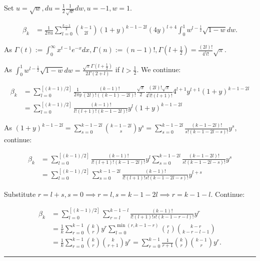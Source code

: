 \documentclass[twoside]{article}
\newenvironment{proof}{{\bf Proof:}}{\hfill\rule{2mm}{2mm}}
\begin{document}
\begin{proof}
	Set $u=\sqrt{w}, du=\frac{1}{2}\frac{1}{\sqrt{w}}dw, u=-1, w=1.$
	
	\begin{equation}
		\begin{split}
			\beta_k&=\frac{1}{2\pi u}\sum^{\frac{k-1}{2}}_{l=0}{k-1\choose 2l}(1+y)^{k-1-2l}(4y)^{l+4}\int^1_0w^{l-\frac{1}{2}}\sqrt{1-w}dw.
		\end{split}
	\end{equation}
	
	As $\Gamma(t):=\int^\infty_{0}x^{t-1}e^{-x}dx, \Gamma(n):=(n-1)!, \Gamma(l+\frac{1}{2})=\frac{(2l)!}{4^l l!}\sqrt{\pi}.$
	
	As $\int^1_0w^{l-\frac{1}{2}}\sqrt{1-w}dw=\frac{\sqrt{\pi}\Gamma(l+\frac12)}{2\Gamma(2+l)}$ if $l>\frac{1}{2}$. We continue:
	
	\begin{equation}
		\begin{split}
			\beta_k &=\sum^{[(k-1)/2]}_{l=0}\frac{1}{2\pi y}\frac{(k-1)!}{(2l)!((k-1)-2l)!}\frac{\sqrt{\pi}}{2}\frac{(2l)!\sqrt{\pi}}{4^l l!(l+1)!}4^{l+1}y^{l+1}(1+y)^{k-1-2l}\\
			&=\sum^{[(k-1)/2]}_{l=0}\frac{(k-1)!}{l!(l+1)!(k-1-2l)!}y^l(1+y)^{k-1-2l}
		\end{split}
	\end{equation}
	
	As $(1+y)^{k-1-2l}=\sum^{k-1-2l}_{s=0}{k-1-2l\choose s}y^s=\sum^{k-1-2l}_{s=0}\frac{(k-1-2l)!}{s!(k-1-2l-s)!}y^s$, continue:
	
	\begin{equation}
		\begin{split}
			\beta_k&=\sum^{[(k-1)/2]}_{l=0}\frac{(k-1)!}{l!(l+1)!(k-1-2l)!}y^l\sum^{k-1-2l}_{s=0}\frac{(k-1-2l)!}{s!(k-1-2l-s)!}y^s\\
			&=\sum^{[(k-1)/2]}_{l=0}\sum^{k-1-2l}_{s=0}\frac{(k-1)!}{l!(l+1)!s!(k-1-2l-s)!}y^{l+s}
		\end{split}
	\end{equation}
	
	Substitute $r=l+s, s=0\implies r=l, s=k-1-2l\implies r=k-1-l$. Continue:
	
	\begin{equation}
		\begin{split}
			\beta_k&=\sum^{[(k-1)/2]}_{l=0}\sum^{k-1-l}_{r=l}\frac{(k-1)!}{l!(l+1)!s!(k-1-r-l)!}y^r\\
			&=\frac{1}{k}\sum^{k-1}_{r=0}{k\choose r}y^r\sum^{\min(r,k-1-r)}_{l=0}{r\choose l}{k-r \choose k-r-l-1}\\
			&=\frac{1}{k}\sum^{k-1}_{r=0}{k\choose r}{k\choose r+1}y^r=\sum^{k-1}_{r=0}\frac{1}{r+1}{k\choose r}{k-1\choose r}y^r.
		\end{split}
	\end{equation}
	
\end{proof}
\end{document}
